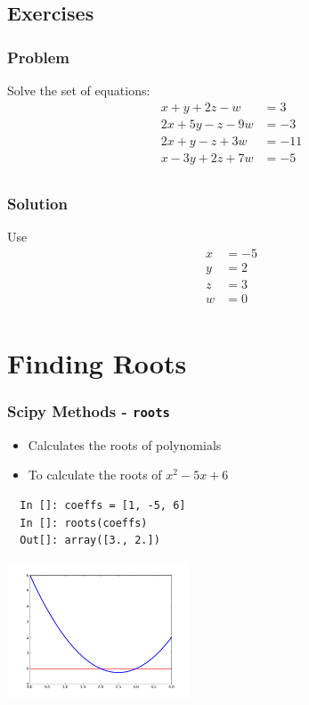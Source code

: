 \documentclass[14pt,compress]{beamer}
\newcounter{time}
\newcommand{\inctime}[1]{\addtocounter{time}{#1}{\tiny \thetime\ m}}
\newcommand{\typ}[1]{\lstinline{#1}}
\newcommand{\kwrd}[1]{ \texttt{\textbf{\color{blue}{#1}}}  }
\begin{document}
\subsection{Exercises}

\begin{frame}[fragile]
\frametitle{Problem}
Solve the set of equations:
\begin{align*}
  x + y + 2z -w & = 3\\
  2x + 5y - z - 9w & = -3\\
  2x + y -z + 3w & = -11 \\
  x - 3y + 2z + 7w & = -5\\
\end{align*}
\inctime{10}
\end{frame}

\begin{frame}[fragile]
\frametitle{Solution}
Use \kwrd{solve()}
\begin{align*}
  x & = -5\\
  y & = 2\\
  z & = 3\\
  w & = 0\\
\end{align*}
\end{frame}

\section{Finding Roots}

\begin{frame}[fragile]
\frametitle{Scipy Methods - \typ{roots}}
\begin{itemize}
\item Calculates the roots of polynomials
\item To calculate the roots of $x^2-5x+6$ 
\end{itemize}
\begin{lstlisting}
  In []: coeffs = [1, -5, 6]
  In []: roots(coeffs)
  Out[]: array([3., 2.])
\end{lstlisting}
\vspace*{-.2in}
\begin{center}
\includegraphics[height=1.6in, interpolate=true]{data/roots}    
\end{center}
\end{frame}
\end{document}
